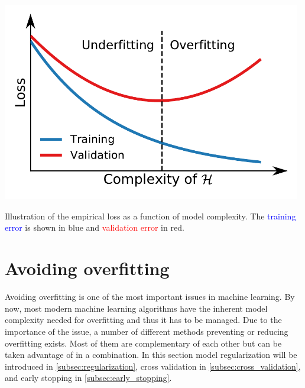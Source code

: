 \begin{marginfigure}
  \includegraphics[width=0.98\textwidth]{figures/overfitting/overfitting_1.pdf}
  \caption[Approximation-Estimation Tradeoff]
    {Illustration of the empirical loss as a function of model complexity. The \textcolor{blue}{training error} is shown in blue and \textcolor{red}{validation error} in red.
    }
  \label{fig:ml:empirical_risk}
\end{marginfigure}


\section{Avoiding overfitting}
\label{sec:ml:overfitting}
Avoiding overfitting is one of the most important issues in machine learning. By now, most modern machine learning algorithms have the inherent model complexity needed for overfitting and thus it has to be managed. Due to the importance of the issue, a number of different methods preventing or reducing overfitting exists. Most of them are complementary of each other but can be taken advantage of in a combination. In this section model regularization will be introduced in \autoref{subsec:regularization}, cross validation in \autoref{subsec:cross_validation}, and early stopping in \autoref{subsec:early_stopping}. 

